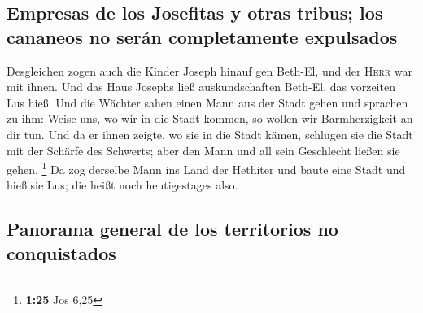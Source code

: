 \hypertarget{empresas-de-los-josefitas-y-otras-tribus-los-cananeos-no-seruxe1n-completamente-expulsados}{%
\subsection{Empresas de los Josefitas y otras tribus; los cananeos no
serán completamente
expulsados}\label{empresas-de-los-josefitas-y-otras-tribus-los-cananeos-no-seruxe1n-completamente-expulsados}}

 Desgleichen zogen auch die Kinder Joseph hinauf gen
Beth-El, und der \textsc{Herr} war mit ihnen.  Und das
Haus Josephs ließ auskundschaften Beth-El, das vorzeiten Lus hieß.
 Und die Wächter sahen einen Mann aus der Stadt gehen und
sprachen zu ihm: Weise uns, wo wir in die Stadt kommen, so wollen wir
Barmherzigkeit an dir tun.  Und da er ihnen zeigte, wo
sie in die Stadt kämen, schlugen sie die Stadt mit der Schärfe des
Schwerts; aber den Mann und all sein Geschlecht ließen sie gehen.
\footnote{\textbf{1:25} Jos 6,25}  Da zog derselbe Mann
ins Land der Hethiter und baute eine Stadt und hieß sie Lus; die heißt
noch heutigestages also.

\hypertarget{panorama-general-de-los-territorios-no-conquistados}{%
\subsection{Panorama general de los territorios no
conquistados}\label{panorama-general-de-los-territorios-no-conquistados}}

